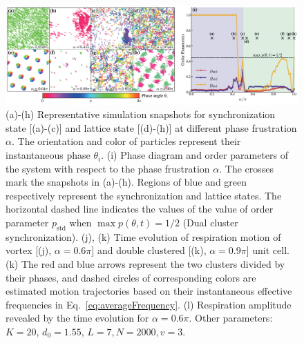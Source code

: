 \documentclass{article}
\begin{document}
\begin{figure}
    \centering
    \includegraphics[width=\textwidth]{./figs/snapshotsAndPhaseDiagram.pdf}
    \caption{
        \label{fig:snapshotsAndPhaseDiagram}
        (a)-(h) Representative simulation snapshots for synchronization state [(a)-(c)] and lattice state [(d)-(h)] at different phase frustration $\alpha$. The orientation and color of particles represent their instantaneous phase $\theta_i$.
        (i) Phase diagram and order parameters of the system with respect to the phase frustration $\alpha$. The crosses mark the snapshots in (a)-(h). Regions of blue and green respectively represent the synchronization and lattice states. The horizontal dashed line indicates the values of the value of order parameter $p_{\mathrm{std}}$ when $\max p(\theta, t)=1/2$ (Dual cluster synchronization). 
        (j), (k) Time evolution of respiration motion of vortex [(j), $\alpha=0.6\pi$] and double clustered [(k), $\alpha=0.9\pi$] unit cell. 
        (k) The red and blue arrows represent the two clusters divided by their phases, and dashed circles of corresponding colors are estimated motion trajectories based on their instantaneous effective frequencies in Eq.~\eqref{eq:averageFrequency}.
        (l) Respiration amplitude revealed by the time evolution for $\alpha=0.6\pi$.
        Other parameters: $K=20$, $d_0=1.55$, $L=7, N=2000, v=3$. 
        }
\end{figure}
\end{document}
